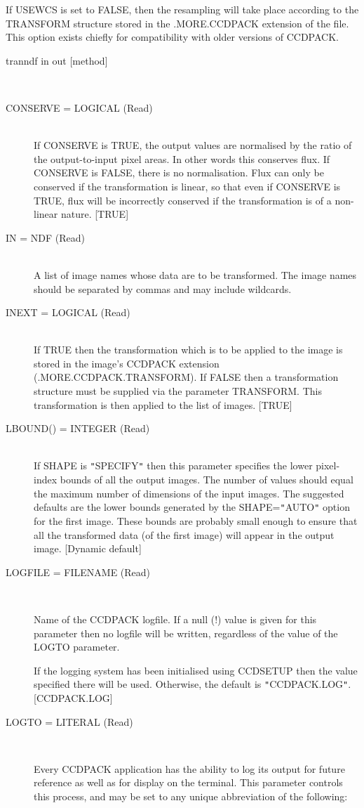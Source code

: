 \documentclass[twoside,11pt]{article}
\newcommand{\htmlref}[2]{#1}
\renewcommand{\_}{\texttt{\symbol{95}}}
\newcommand{\qt}[1]{{\tt "}#1{\tt "}}
\newcommand{\xroutine}[1]{\htmlref{{\sc #1}}{#1}}
\newcommand{\sstusage}[1]{\item[Usage:] \mbox{}
   \begin{description}
      {\ssttt \item #1}
   \end{description}
}
\newcommand{\sstparameters}[1]{
   \item[Parameters:] \mbox{} \\
   \vspace{-3.5ex}
   \begin{description}
      #1
   \end{description}
}
\newcommand{\sstsubsection}[1]{ \item[{#1}] \mbox{} \\}
\newcommand{\sstitemlist}[1]{
  \mbox{} \\
  \vspace{-3.5ex}
  \begin{itemize}
     #1
  \end{itemize}
}
\newcommand{\sstusage}[1]{\item[Usage:]
      \begin{description}
         {\ssttt #1}
      \end{description}
      \\
   }
\newcommand{\sstparameters}[1]{
      \item[Parameters:] \\
      \begin{description}
         #1
      \end{description}
      \\
   }
\newcommand{\sstsubsection}[1]{\item[{#1}]}
\newcommand{\sstitemlist}[1]{
      \begin{itemize}
         #1
      \end{itemize}
      \\
   }
\begin{document}
{{      If USEWCS is set to FALSE, then the resampling will take place
      according to the TRANSFORM structure stored in the .MORE.CCDPACK
      extension of the file.  This option exists chiefly for
      compatibility with older versions of CCDPACK.
   }
   \sstusage{
      tranndf in out [method]
   }
   \sstparameters{
      \sstsubsection{
         CONSERVE = \_LOGICAL (Read)
      }{
         If CONSERVE is TRUE, the output values are normalised by the
         ratio of the output-to-input pixel areas.  In other words
         this conserves flux.  If CONSERVE is FALSE, there is no
         normalisation.  Flux can only be conserved if the
         transformation is linear, so that even if CONSERVE is TRUE,
         flux will be incorrectly conserved if the transformation is
         of a non-linear nature.
         [TRUE]
      }
      \sstsubsection{
         IN = NDF (Read)
      }{
         A list of image names whose data are to be transformed. The image
         names should be separated by commas and may include wildcards.
      }
      \sstsubsection{
         INEXT = \_LOGICAL (Read)
      }{
         If TRUE then the transformation which is to be applied to the
         image is stored in the image's CCDPACK extension
         (.MORE.CCDPACK.TRANSFORM). If FALSE then a transformation
         structure must be supplied via the parameter TRANSFORM. This
         transformation is then applied to the list of images.  [TRUE]
      }
      \sstsubsection{
         LBOUND() = \_INTEGER (Read)
      }{
         If SHAPE is \qt{SPECIFY} then this parameter specifies the lower
         pixel-index bounds of all the output images. The number of
         values should equal the maximum number of dimensions of the
         input images. The suggested defaults are the lower bounds
         generated by the SHAPE=\qt{AUTO} option for the first image. These
         bounds are probably small enough to ensure that all the
         transformed data (of the first image) will appear in the output
         image.
         [Dynamic default]
      }
      \sstsubsection{
         LOGFILE = FILENAME (Read)
      }{
         Name of the CCDPACK logfile.  If a null (!) value is given for
         this parameter then no logfile will be written, regardless of
         the value of the LOGTO parameter.

         If the logging system has been initialised using \xroutine{CCDSETUP}
         then the value specified there will be used. Otherwise, the
         default is \qt{CCDPACK.LOG}.
         [CCDPACK.LOG]
      }
      \sstsubsection{
         LOGTO = LITERAL (Read)
      }{
         Every CCDPACK application has the ability to log its output
         for future reference as well as for display on the terminal.
         This parameter controls this process, and may be set to any
         unique abbreviation of the following:
         \sstitemlist{

}}}}
\end{document}
